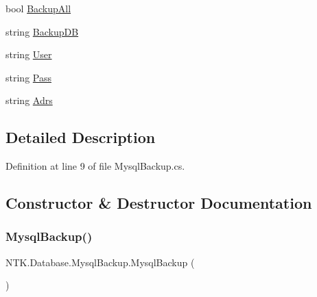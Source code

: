 \begin{DoxyCompactItemize}
\item 
bool \mbox{\hyperlink{class_n_t_k_1_1_database_1_1_mysql_backup_a0d184ac458595cd7a9b2ebad31e87d0b}{Backup\+All}}
\item 
string \mbox{\hyperlink{class_n_t_k_1_1_database_1_1_mysql_backup_ab987db5b4b54e84e502709c3ac48865c}{Backup\+DB}}
\item 
string \mbox{\hyperlink{class_n_t_k_1_1_database_1_1_mysql_backup_a30337044b79167415db5a0f13927e36a}{User}}
\item 
string \mbox{\hyperlink{class_n_t_k_1_1_database_1_1_mysql_backup_ae91d5192e7d696e65f4252e2f8093ac3}{Pass}}
\item 
string \mbox{\hyperlink{class_n_t_k_1_1_database_1_1_mysql_backup_a1fe160d533e9554bdee2a40392086440}{Adrs}}
\end{DoxyCompactItemize}


\subsection{Detailed Description}


Definition at line 9 of file Mysql\+Backup.\+cs.



\subsection{Constructor \& Destructor Documentation}
\mbox{\label{class_n_t_k_1_1_database_1_1_mysql_backup_a259db9b8c963cd33600a1ce9e9ae74d0}} 
\subsubsection{\texorpdfstring{MysqlBackup()}{MysqlBackup()}}
{\footnotesize\ttfamily N\+T\+K.\+Database.\+Mysql\+Backup.\+Mysql\+Backup (\begin{DoxyParamCaption}{ }\end{DoxyParamCaption})}



